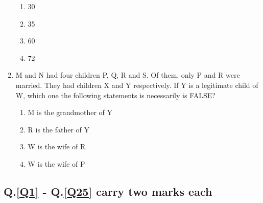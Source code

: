 \documentclass[journal,12pt,onecolumn]{IEEEtran}
\theoremstyle{remark}
\begin{document}
\begin{enumerate}
\begin{figure}[!ht]
\label{fig:my_label}
\end{figure}
\begin{enumerate}
    \item 30
    \item 35
    \item 60
    \item 72
\end{enumerate}
    \item \label{q10}M and N had four children P, Q, R and S. Of them, only P and R were married. They had children X and Y respectively. If Y is a legitimate child of W, which one the following statements is necessarily is FALSE?
    \begin{enumerate}
        \item M is the grandmother of Y
        \item R is the father of Y
        \item W is the wife of R
        \item W is the wife of P
    \end{enumerate}
\end{enumerate}


    \subsection*{Q.\ref{Q1} - Q.\ref{Q25} carry two marks each} 
    
\end{document}
